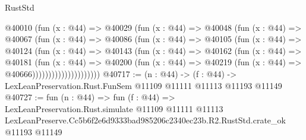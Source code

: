 \begin{lexlean}{RustStd}
\begin{coremodule}
                    @40010
                      (fun (x : @44) =>
                      @40029
                        (fun (x : @44) =>
                        @40048
                          (fun (x : @44) =>
                          @40067
                            (fun (x : @44) =>
                            @40086
                              (fun (x : @44) =>
                              @40105
                                (fun (x : @44) =>
                                @40124
                                  (fun (x : @44) =>
                                  @40143
                                    (fun (x : @44) =>
                                    @40162
                                      (fun (x : @44) =>
                                      @40181
                                        (fun (x : @44) =>
                                        @40200
                                          (fun (x : @44) =>
                                          @40219 (fun (x : @44) => @40666)))))))))))))))))))))
@40717 := (n : @44) ->
  (f : @44) -> LexLeanPreservation.Rust.FunSem @11109 @11111 @11113 @11193 @11149
@40727 := fun (n : @44) =>
  fun (f : @44) =>
  LexLeanPreservation.Rust.simulate
    @11109
    @11111
    @11113
    LexLeanPreserve.Cc5b6f2e6d9333bad985206c2340ec23b.R2.RustStd.crate_ok
    @11193
    @11149
\end{coremodule}
\end{lexlean}

